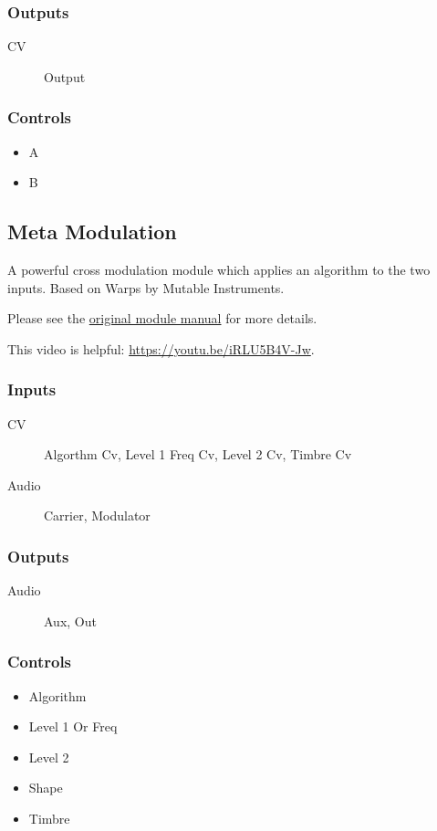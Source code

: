\subsubsection{Outputs}
\begin{description}
\item [CV] Output
\end{description}

\subsubsection{Controls}
\begin{itemize}
\item A
\item B
\end{itemize}

\subsection{Meta Modulation}

A powerful cross modulation module which applies an algorithm to the two inputs. Based on Warps by Mutable Instruments.



Please see the \href{https://www.mutable-instruments.net/modules/warps/manual/}{original module manual} for more details.

This video is helpful: \url{https://youtu.be/iRLU5B4V-Jw}.

\subsubsection{Inputs}
\begin{description}
\item [CV] Algorthm Cv, Level 1 Freq Cv, Level 2 Cv, Timbre Cv
\item [Audio] Carrier, Modulator
\end{description}

\subsubsection{Outputs}
\begin{description}
\item [Audio] Aux, Out
\end{description}

\subsubsection{Controls}
\begin{itemize}
\item Algorithm
\item Level 1 Or Freq
\item Level 2
\item Shape
\item Timbre
\end{itemize}

